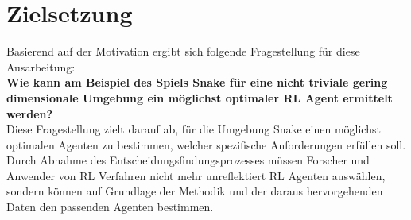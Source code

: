 \section{Zielsetzung} \label{sec:Einleitung_Forschungsfrage}
Basierend auf der Motivation ergibt sich folgende Fragestellung für diese Ausarbeitung:\\
\textbf{Wie kann am Beispiel des Spiels Snake für eine nicht triviale gering dimensionale Umgebung ein möglichst optimaler RL Agent ermittelt werden?}\\
Diese Fragestellung zielt darauf ab, für die Umgebung Snake einen möglichst optimalen Agenten zu bestimmen, welcher spezifische Anforderungen erfüllen soll.\\
Durch Abnahme des Entscheidungsfindungsprozesses müssen Forscher und Anwender von RL Verfahren nicht mehr unreflektiert RL Agenten auswählen, sondern können auf Grundlage der Methodik und der daraus hervorgehenden Daten den passenden Agenten bestimmen.

